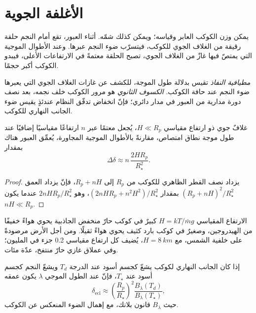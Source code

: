 \section{الأغلفة الجوية}\label{sec:b3:exoplanets:atmospheres}

يمكن وزن الكوكب العابر وقياسه؛ ويمكن كذلك شمّه.
أثناء العبور، تقع أمام النجم حلقة رقيقة من الغلاف الجوي للكوكب،
فيتسرّب ضوء النجم عبرها. وعند الأطوال الموجية التي يمتصّ فيها غازٌ
من الغلاف الجوي، تصبح الحلقة معتمةً في الارتفاعات الأعلى، فيبدو الكوكب
أكبر حجمًا.

\begin{definition}\label{def:b3:exoplanets:transmission}
\emph{مطيافية النفاذ} تقيس  بدلالة طول الموجة،
للكشف عن غازات الغلاف الجوي التي يعبرها ضوء النجم عند
حافة الكوكب.
\emph{الكسوف الثانوي} هو مرور
الكوكب خلف نجمه، بعد نصف دورة مدارية من العبور في مدار دائري؛
فإنّ انخفاض تدفّق النظام عندئذٍ يقيس ضوء
الجانب النهاري للكوكب.
\end{definition}

\begin{proposition}\label{prop:b3:exoplanets:transmission}
غلافٌ جوي ذو ارتفاع مقياسي $H \ll R_p$، يُجعل معتمًا عبر $n$ ارتفاعًا مقياسيًا إضافيًا
عند طول موجة نطاق امتصاص، مقارنةً بالأطوال الموجية المجاورة،
يُعمِّق العبور هناك بمقدار
\[
\Delta\delta \approx n\,\frac{2HR_p}{R_\star^2} .
\]
\end{proposition}

\begin{proof}
يزداد نصف القطر الظاهري للكوكب من $R_p$ إلى $R_p + nH$، فإنّ
يزداد العمق $(R_p + nH)^2/R_\star^2$ بمقدار $(2nHR_p + n^2H^2)/R_\star^2$،
وهو $2nHR_p/R_\star^2$ عندما يكون $nH \ll R_p$.
\end{proof}

الارتفاع المقياسي $H = kT/\bar m g$ كبيرٌ في كوكب حارّ منخفض الجاذبية
يحوي هواءً خفيفًا من الهيدروجين، وصغيرٌ في كوكب بارد كثيف يحوي
هواءً ثقيلًا. ومن أجل الأرض مرصودةً على خلفية الشمس، مع $H = \qty{8}{km}$،
يُضيف كل ارتفاع مقياسي 0.2 جزء في المليون؛ وفي عملاق غازي حارّ منتفخ،
عدّة مئات.

\begin{proposition}\label{prop:b3:exoplanets:eclipse}
إذا كان الجانب النهاري لكوكب يشعّ كجسم أسود عند الدرجة
$T_d$ ويشعّ النجم كجسم أسود عند $T_\star$، فإنّ  عند الطول الموجي
$\lambda$ يكون عمقه
\[
\delta_\mathrm{ecl} \approx \left(\frac{R_p}{R_\star}\right)^2
  \frac{B_\lambda(T_d)}{B_\lambda(T_\star)},
\]
حيث $B_\lambda$ قانون بلانك، مع إهمال الضوء المنعكس عن الكوكب.
\end{proposition}

